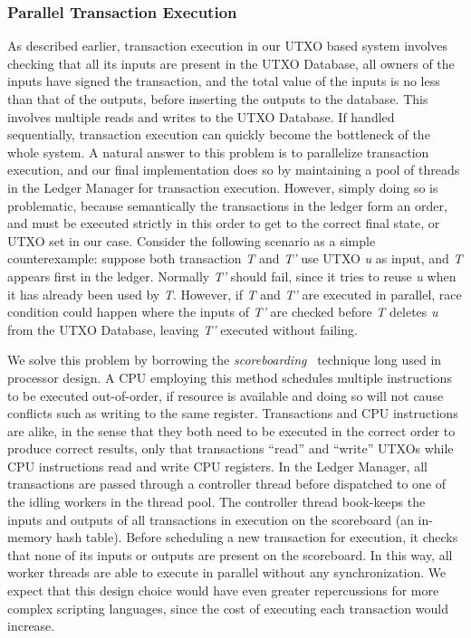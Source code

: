 \subsubsection{Parallel Transaction Execution}
\label{sec:scoreboarding}
As described earlier, transaction execution in our UTXO based system involves checking that all its inputs are present in the UTXO Database, all owners of the inputs have signed the transaction, and the total value of the inputs is no less than that of the outputs, before inserting the outputs to the database. This involves multiple reads and writes to the UTXO Database. If handled sequentially, transaction execution can quickly become the bottleneck of the whole system. A natural answer to this problem is to parallelize transaction execution, and our final implementation does so by maintaining a pool of threads in the Ledger Manager for transaction execution. However, simply doing so is problematic, because semantically the transactions in the ledger form an order, and must be executed strictly in this order to get to the correct final state, or UTXO set in our case. Consider the following scenario as a simple counterexample: suppose both transaction \textit{T} and \textit{T'} use UTXO \textit{u} as input, and \textit{T} appears first in the ledger. Normally \textit{T'} should fail, since it tries to reuse \textit{u} when it has already been used by \textit{T}. However, if \textit{T} and \textit{T'} are executed in parallel, race condition could happen where the inputs of \textit{T'} are checked before \textit{T} deletes \textit{u} from the UTXO Database, leaving \textit{T'} executed without failing.

We solve this problem by borrowing the \textit{scoreboarding}~\cite{scoreboarding} technique long used in processor design. A CPU employing this method schedules multiple instructions to be executed out-of-order, if resource is available and doing so will not cause conflicts such as writing to the same register. Transactions and CPU instructions are alike, in the sense that they both need to be executed in the correct order to produce correct results, only that transactions ``read'' and ``write'' UTXOs while CPU instructions read and write CPU registers. In the Ledger Manager, all transactions are passed through a controller thread before dispatched to one of the idling workers in the thread pool. The controller thread book-keeps the inputs and outputs of all transactions in execution on the scoreboard (an in-memory hash table). Before scheduling a new transaction for execution, it checks that none of its inputs or outputs are present on the scoreboard. In this way, all worker threads are able to execute in parallel without any synchronization. We expect that this design choice would have even greater repercussions for more complex scripting languages, since the cost of executing each transaction would increase.  


